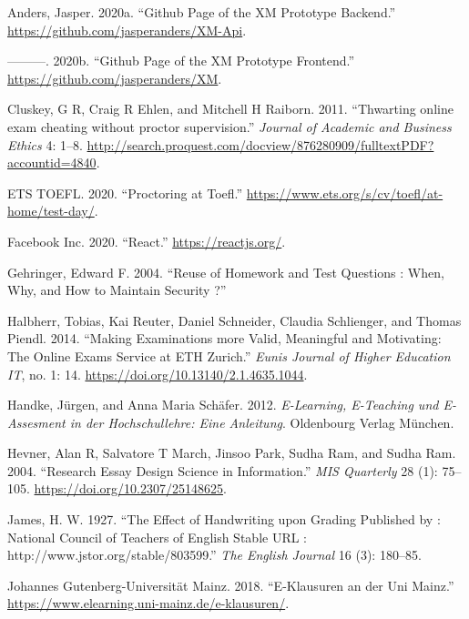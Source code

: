\hypertarget{refs}{}
\begin{cslreferences}
\leavevmode\hypertarget{ref-XM-Backend}{}%
Anders, Jasper. 2020a. ``Github Page of the XM Prototype Backend.''
\url{https://github.com/jasperanders/XM-Api}.

\leavevmode\hypertarget{ref-XM-Frontend}{}%
---------. 2020b. ``Github Page of the XM Prototype Frontend.''
\url{https://github.com/jasperanders/XM}.

\leavevmode\hypertarget{ref-Cluskey2011}{}%
Cluskey, G R, Craig R Ehlen, and Mitchell H Raiborn. 2011. ``Thwarting
online exam cheating without proctor supervision.'' \emph{Journal of
Academic and Business Ethics} 4: 1--8.
\url{http://search.proquest.com/docview/876280909/fulltextPDF?accountid=4840}.

\leavevmode\hypertarget{ref-ETSTOEFL}{}%
ETS TOEFL. 2020. ``Proctoring at Toefl.''
\url{https://www.ets.org/s/cv/toefl/at-home/test-day/}.

\leavevmode\hypertarget{ref-FacebookInc}{}%
Facebook Inc. 2020. ``React.'' \url{https://reactjs.org/}.

\leavevmode\hypertarget{ref-Gehringer2004}{}%
Gehringer, Edward F. 2004. ``Reuse of Homework and Test Questions :
When, Why, and How to Maintain Security ?''

\leavevmode\hypertarget{ref-Halbherr2014}{}%
Halbherr, Tobias, Kai Reuter, Daniel Schneider, Claudia Schlienger, and
Thomas Piendl. 2014. ``Making Examinations more Valid, Meaningful and
Motivating: The Online Exams Service at ETH Zurich.'' \emph{Eunis
Journal of Higher Education IT}, no. 1: 14.
\url{https://doi.org/10.13140/2.1.4635.1044}.

\leavevmode\hypertarget{ref-Handke2012}{}%
Handke, Jürgen, and Anna Maria Schäfer. 2012. \emph{E-Learning,
E-Teaching und E-Assesment in der Hochschullehre: Eine Anleitung}.
Oldenbourg Verlag München.

\leavevmode\hypertarget{ref-Hevner2004}{}%
Hevner, Alan R, Salvatore T March, Jinsoo Park, Sudha Ram, and Sudha
Ram. 2004. ``Research Essay Design Science in Information.'' \emph{MIS
Quarterly} 28 (1): 75--105. \url{https://doi.org/10.2307/25148625}.

\leavevmode\hypertarget{ref-James1927}{}%
James, H. W. 1927. ``The Effect of Handwriting upon Grading Published by
: National Council of Teachers of English Stable URL :
http://www.jstor.org/stable/803599.'' \emph{The English Journal} 16 (3):
180--85.

\leavevmode\hypertarget{ref-JohannesGutenberg-UniversitatMainz}{}%
Johannes Gutenberg-Universität Mainz. 2018. ``E-Klausuren an der Uni
Mainz.'' \url{https://www.elearning.uni-mainz.de/e-klausuren/}.


\end{cslreferences}
